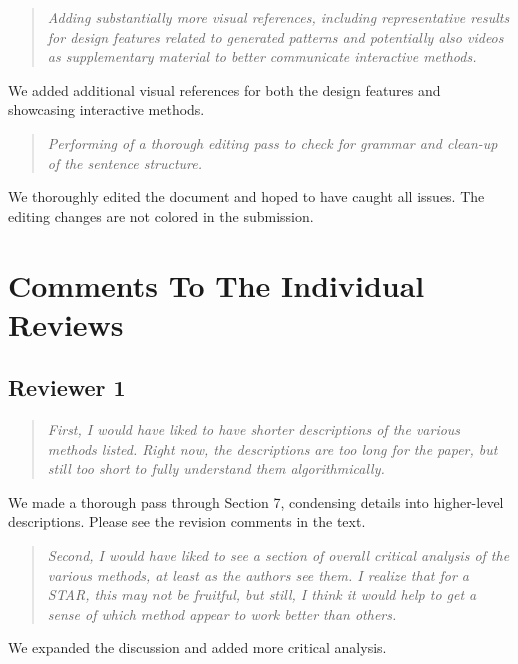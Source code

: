 \documentclass{egpubl}
\newcommand{\rev}[2]{{\color{greenrev}\textsuperscript{#1}#2}}
\renewcommand{\rev}[2]{{#2}}
\begin{document}
\begin{quote}
\emph{
    Adding substantially more visual references, including representative results for design features related to generated patterns and potentially also videos as supplementary material to better communicate interactive methods.
    }
\end{quote}


\rev{}{We added additional visual references for both the design features and showcasing interactive methods.}

\begin{quote}
\emph{
    Performing of a thorough editing pass to check for grammar and clean-up of the sentence structure.
    }
\end{quote}


\rev{}{We thoroughly edited the document and hoped to have caught all issues. The editing changes are not colored in the submission.}


\section*{Comments To The Individual Reviews}

\subsection*{Reviewer 1} 

\begin{quote}
\emph{First, I would have liked to have shorter descriptions of the various methods listed. Right now, the descriptions are too long for the paper, but still too short to fully understand them algorithmically.}
\end{quote}

\rev{}{We made a thorough pass through Section 7, condensing details into higher-level descriptions. Please see the revision comments in the text.}


\begin{quote}
\emph{Second, I would have liked to see a section of overall critical analysis of the various methods, at least as the authors see them. I realize that for a STAR, this may not be fruitful, but still, I think it would help to get a sense of which method appear to work better than others.}
\end{quote}


\rev{}{We expanded the discussion and added more critical analysis.}
\end{document}
